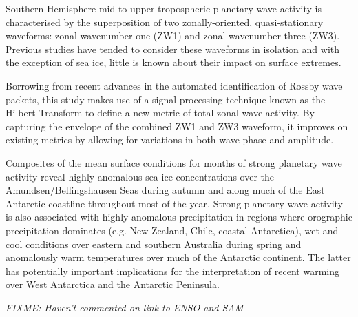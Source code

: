 Southern Hemisphere mid-to-upper tropospheric planetary wave activity is characterised by the superposition of two zonally-oriented, quasi-stationary waveforms: zonal wavenumber one (ZW1) and zonal wavenumber three (ZW3). Previous studies have tended to consider these waveforms in isolation and with the exception of sea ice, little is known about their impact on surface extremes. 

Borrowing from recent advances in the automated identification of Rossby wave packets, this study makes use of a signal processing technique known as the Hilbert Transform to define a new metric of total zonal wave activity. By capturing the envelope of the combined ZW1 and ZW3 waveform, it improves on existing metrics by allowing for variations in both wave phase and amplitude.

Composites of the mean surface conditions for months of strong planetary wave activity reveal highly anomalous sea ice concentrations over the Amundsen/Bellingshausen Seas during autumn and along much of the East Antarctic coastline throughout most of the year. Strong planetary wave activity is also associated with highly anomalous precipitation in regions where orographic precipitation dominates (e.g. New Zealand, Chile, coastal Antarctica), wet and cool conditions over eastern and southern Australia during spring and anomalously warm temperatures over much of the Antarctic continent. The latter has potentially important implications for the interpretation of recent warming over West Antarctica and the Antarctic Peninsula.

\textit{FIXME: Haven't commented on link to ENSO and SAM}
